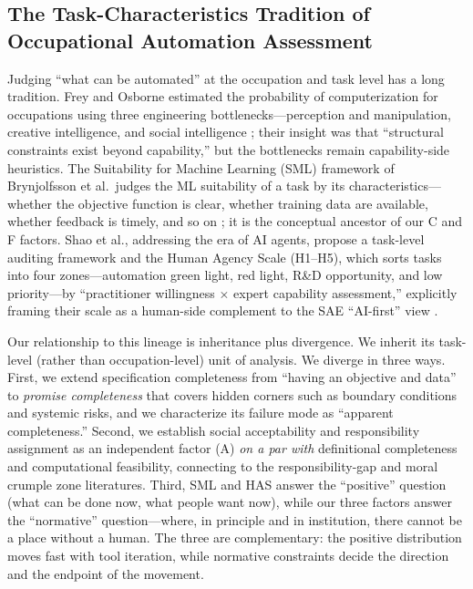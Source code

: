 \documentclass[11pt]{article}
\begin{document}
\subsection{The Task-Characteristics Tradition of Occupational Automation
Assessment}
Judging ``what can be automated'' at the occupation and task level has a
long tradition. Frey and Osborne estimated the probability of
computerization for occupations using three engineering bottlenecks---perception
and manipulation, creative intelligence, and social intelligence
\cite{freyosborne}; their insight was that ``structural constraints exist
beyond capability,'' but the bottlenecks remain capability-side
heuristics. The Suitability for Machine Learning (SML) framework of
Brynjolfsson et al.\ judges the ML suitability of a task by its
characteristics---whether the objective function is clear, whether training
data are available, whether feedback is timely, and so on
\cite{sml_aea,sml_science}; it is the conceptual ancestor of our C and F
factors. Shao et al., addressing the era of AI agents, propose a task-level
auditing framework and the Human Agency Scale (H1--H5), which sorts tasks
into four zones---automation green light, red light, R\&D opportunity, and
low priority---by ``practitioner willingness $\times$ expert capability
assessment,'' explicitly framing their scale as a human-side complement to
the SAE ``AI-first'' view \cite{shao}.

Our relationship to this lineage is inheritance plus divergence. We inherit
its task-level (rather than occupation-level) unit of analysis. We diverge
in three ways. First, we extend specification completeness from ``having an
objective and data'' to \emph{promise completeness} that covers hidden
corners such as boundary conditions and systemic risks, and we characterize
its failure mode as ``apparent completeness.'' Second, we establish social
acceptability and responsibility assignment as an independent factor (A)
\emph{on a par with} definitional completeness and computational
feasibility, connecting to the responsibility-gap \cite{matthias} and moral
crumple zone \cite{elish} literatures. Third, SML and HAS answer the
``positive'' question (what can be done now, what people want now), while
our three factors answer the ``normative'' question---where, in principle
and in institution, there cannot be a place without a human. The three are
complementary: the positive distribution moves fast with tool iteration,
while normative constraints decide the direction and the endpoint of the
movement.
\end{document}
